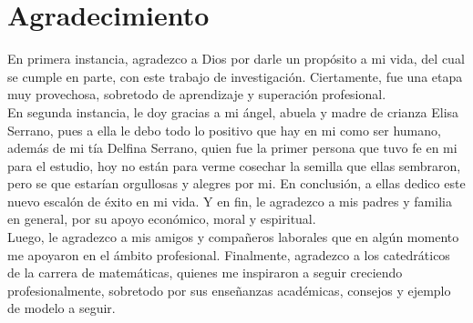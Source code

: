 \documentclass[11pt,titlepage]{report}
\begin{document}
\newpage
\thispagestyle{empty}
\vspace*{5cm}
\section*{Agradecimiento}
En primera instancia, agradezco a Dios por darle un propósito a mi vida, del cual se cumple en parte, con este trabajo de investigación. Ciertamente, fue una etapa muy provechosa, sobretodo de aprendizaje y superación profesional.\\

En segunda instancia, le doy gracias a mi ángel, abuela y madre de crianza Elisa Serrano, pues a ella le debo todo lo positivo que hay en mi como ser humano, además de mi tía Delfina Serrano, quien fue la primer persona que tuvo fe en mi para el estudio, hoy no están para verme cosechar la semilla que ellas sembraron, pero se que estarían orgullosas y alegres por mi. En conclusión, a ellas dedico este nuevo escalón de éxito en mi vida. Y en fin, le agradezco  a mis padres y familia en general, por su apoyo económico, moral y espiritual.\\

Luego, le agradezco a mis amigos y compañeros laborales que en algún momento me apoyaron en el ámbito profesional. Finalmente, agradezco a los catedráticos de la carrera de matemáticas, quienes me inspiraron a seguir creciendo profesionalmente, sobretodo por sus enseñanzas académicas, consejos y ejemplo de modelo a seguir.

\newpage
\thispagestyle{empty}
\vspace*{2cm}
\end{document}
